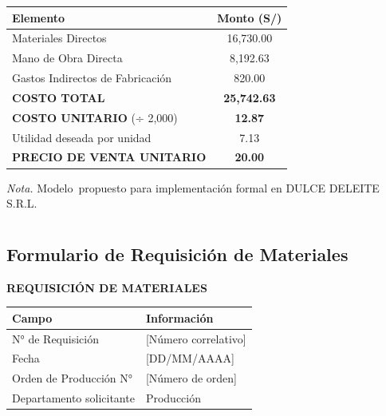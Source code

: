 \documentclass[
  stu,
  floatsintext,
  longtable,
  a4paper,
  nolmodern,
  notxfonts,
  notimes,
  12pt,
  colorlinks=true,linkcolor=blue,citecolor=blue,urlcolor=blue]{apa7}
\newcounter{none} %
\begin{document}
\begin{table}

{\caption{{Modelo de Hoja de Costos por
Orden}{\label{tbl-hoja-costos}}}}

{\def\LTcaptype{none} %
\begin{longtable}[]{@{}lc@{}}
\toprule\noalign{}
Elemento & Monto (S/) \\
\midrule\noalign{}
\endhead
\bottomrule\noalign{}
\endlastfoot
Materiales Directos & 16,730.00 \\
Mano de Obra Directa & 8,192.63 \\
Gastos Indirectos de Fabricación & 820.00 \\
\textbf{COSTO TOTAL} & \textbf{25,742.63} \\
\textbf{COSTO UNITARIO} (÷ 2,000) & \textbf{12.87} \\
Utilidad deseada por unidad & 7.13 \\
\textbf{PRECIO DE VENTA UNITARIO} & \textbf{20.00} \\
\end{longtable}
}

\noindent \emph{Nota.} Modelo~propuesto para implementación formal en
DULCE DELEITE S.R.L.

\end{table}

\section{}\label{}

\subsection{Formulario de Requisición de
Materiales}\label{apx-requisicion}

\textbf{REQUISICIÓN DE MATERIALES}

{\def\LTcaptype{none} %
\begin{longtable}[]{@{}ll@{}}
\toprule\noalign{}
Campo & Información \\
\midrule\noalign{}
\endhead
\bottomrule\noalign{}
\endlastfoot
N° de Requisición & {[}Número correlativo{]} \\
Fecha & {[}DD/MM/AAAA{]} \\
Orden de Producción N° & {[}Número de orden{]} \\
Departamento solicitante & Producción \\
\end{longtable}
}
\end{document}
